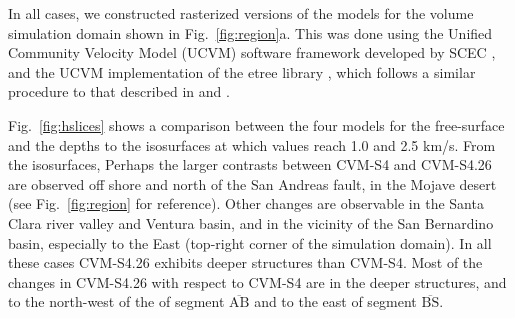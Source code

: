 In all cases, we constructed rasterized versions of the models for the volume simulation domain shown in Fig.~\ref{fig:region}a. This was done using the Unified Community Velocity Model (UCVM) software framework developed by SCEC \citep{Small_2011_AGU, Gill_2015_SSA}, and the UCVM implementation of the etree library \citep{Tu_2003_Tech}, which follows a similar procedure to that described in \citet{Taborda_2007_Proc} and \citet{Schlosser_2008_Proc}.

Fig.~\ref{fig:hslices} shows a comparison between the four models for the free-surface \vs{} and the depths to the isosurfaces at which \vs{} values reach 1.0 and 2.5 km/s. From the isosurfaces, Perhaps the larger contrasts between CVM-S4 and CVM-S4.26 are observed off shore and north of the San Andreas fault, in the Mojave desert (see Fig.~\ref{fig:region} for reference). Other changes are observable in the Santa Clara river valley and Ventura basin, and in the vicinity of the San Bernardino basin, especially to the East (top-right corner of the simulation domain). In all these cases CVM-S4.26 exhibits deeper structures than CVM-S4. Most of the changes in CVM-S4.26 with respect to CVM-S4 are in the deeper structures, and to the north-west of the of segment $\overline{\mathrm{AB}}$ and to the east of segment $\overline{\mathrm{BS}}$.

